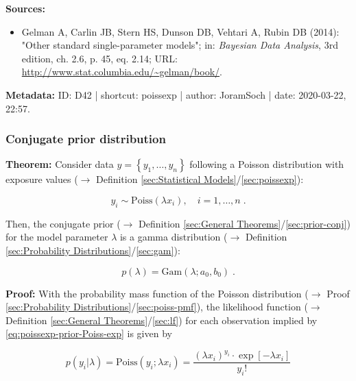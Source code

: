 \documentclass[a4paper,12pt,twoside]{book}
\begin{document}
\vspace{1em}
\textbf{Sources:}
\begin{itemize}
\item Gelman A, Carlin JB, Stern HS, Dunson DB, Vehtari A, Rubin DB (2014): "Other standard single-parameter models"; in: \textit{Bayesian Data Analysis}, 3rd edition, ch. 2.6, p. 45, eq. 2.14; URL: \url{http://www.stat.columbia.edu/~gelman/book/}.
\end{itemize}


\vspace{1em}
\textbf{Metadata:} ID: D42 | shortcut: poissexp | author: JoramSoch | date: 2020-03-22, 22:57.
\vspace{1em}



\subsubsection[\textbf{Conjugate prior distribution}]{Conjugate prior distribution} \label{sec:poissexp-prior}
\setcounter{equation}{0}

\textbf{Theorem:} Consider data $y = \left\lbrace y_1, \ldots, y_n \right\rbrace$ following a Poisson distribution with exposure values ($\rightarrow$ Definition \ref{sec:Statistical Models}/\ref{sec:poissexp}):

\begin{equation} \label{eq:poissexp-prior-Poiss-exp}
y_i \sim \mathrm{Poiss}(\lambda x_i), \quad i = 1, \ldots, n \; .
\end{equation}

Then, the conjugate prior ($\rightarrow$ Definition \ref{sec:General Theorems}/\ref{sec:prior-conj}) for the model parameter $\lambda$ is a gamma distribution ($\rightarrow$ Definition \ref{sec:Probability Distributions}/\ref{sec:gam}):

\begin{equation} \label{eq:poissexp-prior-Poiss-exp-prior}
p(\lambda) = \mathrm{Gam}(\lambda; a_0, b_0) \; .
\end{equation}


\vspace{1em}
\textbf{Proof:} With the probability mass function of the Poisson distribution ($\rightarrow$ Proof \ref{sec:Probability Distributions}/\ref{sec:poiss-pmf}), the likelihood function ($\rightarrow$ Definition \ref{sec:General Theorems}/\ref{sec:lf}) for each observation implied by \eqref{eq:poissexp-prior-Poiss-exp} is given by

\begin{equation} \label{eq:poissexp-prior-Poiss-exp-LF-s1}
p(y_i|\lambda) = \mathrm{Poiss}(y_i; \lambda x_i) = \frac{(\lambda x_i)^{y_i} \cdot \exp\left[-\lambda x_i\right]}{y_i !}
\end{equation}
\end{document}
